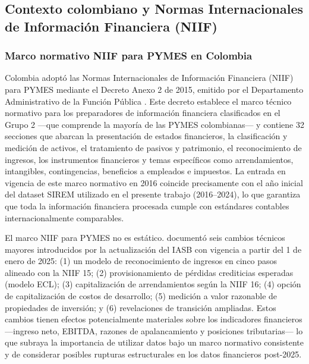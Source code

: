 \documentclass[12pt, letterpaper]{article}
\begin{document}
\subsection{Contexto colombiano y Normas Internacionales de Informaci\'on Financiera (NIIF)}
\label{sec:niif}

\subsubsection{Marco normativo NIIF para PYMES en Colombia}

Colombia adopt\'o las Normas Internacionales de Informaci\'on Financiera (NIIF) para PYMES mediante el Decreto Anexo 2 de 2015, emitido por el Departamento Administrativo de la Funci\'on P\'ublica \citep{DAFP2015}. Este decreto establece el marco t\'ecnico normativo para los preparadores de informaci\'on financiera clasificados en el Grupo 2 ---que comprende la mayor\'ia de las PYMES colombianas--- y contiene 32 secciones que abarcan la presentaci\'on de estados financieros, la clasificaci\'on y medici\'on de activos, el tratamiento de pasivos y patrimonio, el reconocimiento de ingresos, los instrumentos financieros y temas espec\'ificos como arrendamientos, intangibles, contingencias, beneficios a empleados e impuestos. La entrada en vigencia de este marco normativo en 2016 coincide precisamente con el a\~no inicial del dataset SIREM utilizado en el presente trabajo (2016--2024), lo que garantiza que toda la informaci\'on financiera procesada cumple con est\'andares contables internacionalmente comparables.

El marco NIIF para PYMES no es est\'atico. \citet{Bubb2024} document\'o seis cambios t\'ecnicos mayores introducidos por la actualizaci\'on del IASB con vigencia a partir del 1 de enero de 2025: (1) un modelo de reconocimiento de ingresos en cinco pasos alineado con la NIIF 15; (2) provisionamiento de p\'erdidas crediticias esperadas (modelo ECL); (3) capitalizaci\'on de arrendamientos seg\'un la NIIF 16; (4) opci\'on de capitalizaci\'on de costos de desarrollo; (5) medici\'on a valor razonable de propiedades de inversi\'on; y (6) revelaciones de transici\'on ampliadas. Estos cambios tienen efectos potencialmente materiales sobre los indicadores financieros ---ingreso neto, EBITDA, razones de apalancamiento y posiciones tributarias--- lo que subraya la importancia de utilizar datos bajo un marco normativo consistente y de considerar posibles rupturas estructurales en los datos financieros post-2025.
\end{document}
